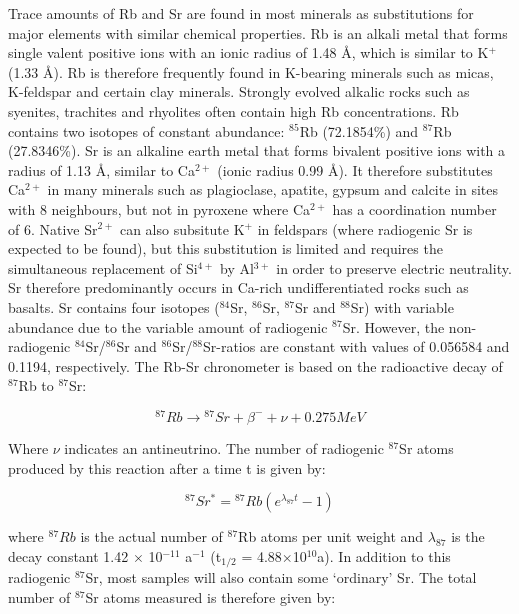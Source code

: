 \documentclass{book}
\begin{document}
Trace amounts of Rb and Sr are found in most minerals as substitutions
for major elements with similar chemical properties. Rb is an alkali
metal that forms single valent positive ions with an ionic radius of
1.48 \AA, which is similar to K$^+$ (1.33 \AA).  Rb is therefore
frequently found in K-bearing minerals such as micas, K-feldspar and
certain clay minerals. Strongly evolved alkalic rocks such as
syenites, trachites and rhyolites often contain high Rb
concentrations.  Rb contains two isotopes of constant abundance:
$^{85}$Rb (72.1854\%) and $^{87}$Rb (27.8346\%). Sr is an alkaline
earth metal that forms bivalent positive ions with a radius of 1.13
\AA, similar to Ca$^{2+}$ (ionic radius 0.99 \AA). It therefore
substitutes Ca$^{2+}$ in many minerals such as plagioclase, apatite,
gypsum and calcite in sites with 8 neighbours, but not in pyroxene
where Ca$^{2+}$ has a coordination number of 6. Native Sr$^{2+}$ can
also subsitute K$^+$ in feldspars (where radiogenic Sr is expected to
be found), but this substitution is limited and requires the
simultaneous replacement of Si$^{4+}$ by Al$^{3+}$ in order to
preserve electric neutrality.  Sr therefore predominantly occurs in
Ca-rich undifferentiated rocks such as basalts. Sr contains four
isotopes ($^{84}$Sr, $^{86}$Sr, $^{87}$Sr and $^{88}$Sr) with variable
abundance due to the variable amount of radiogenic $^{87}$Sr. However,
the non-radiogenic $^{84}$Sr/$^{86}$Sr and $^{86}$Sr/$^{88}$Sr-ratios
are constant with values of 0.056584 and 0.1194, respectively. The
Rb-Sr chronometer is based on the radioactive decay of $^{87}$Rb to
$^{87}$Sr:

\begin{equation}
{}^{87}Rb \rightarrow {}^{87}Sr + \beta^- + \nu +
0.275 MeV
\label{eq:87Rb}
\end{equation}

Where $\nu$ indicates an antineutrino. The number of radiogenic
${}^{87}$Sr atoms produced by this reaction after a time t is given
by:

\begin{equation}
{}^{87}Sr^* = {}^{87}Rb (e^{\lambda_{87} t} - 1)
\label{eq:87Sr*}
\end{equation}

where $^{87}Rb$ is the actual number of $^{87}$Rb atoms per unit
weight and $\lambda_{87}$ is the decay constant 1.42 $\times$
10$^{-11}$ a$^{-1}$ (t$_{1/2}$ = 4.88$\times$10$^{10}$a).  In addition
to this radiogenic $^{87}$Sr, most samples will also contain some
`ordinary' Sr. The total number of $^{87}$Sr atoms measured is
therefore given by:
\end{document}
